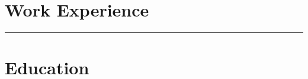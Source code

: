 \documentclass[10pt]{article}
\newcommand{\ruleLine}{
            \begin{center}
                \color{highlight}
                \rule{0.5\textwidth}{.4pt}
            \end{center}
        }
\begin{document}
        \begin{minipage}[t]{0.6\textwidth}
            \vspace{0pt}

            \section{Work Experience}

            

                \ruleLine

        \end{minipage}
        \hfill
        \begin{minipage}[t]{0.35\textwidth}
            \vspace{0pt}

            \section{Education}

            

            
        \end{minipage}
\end{document}
